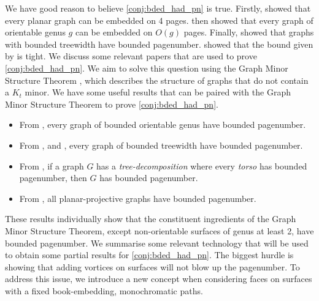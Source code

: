 We have good reason to believe \cref{conj:bded_had_pn} is true. Firstly, \textcite{yannakakisEmbeddingPlanarGraphs1989} showed that every planar graph can be embedded on 4 pages. \textcite{heathPagenumberGenusGraphs1992} then showed that every graph of orientable genus $g$ can be embedded on $O(g)$ pages. Finally, \textcite{ganleyPagenumberTrees2001} showed that graphs with bounded treewidth have bounded pagenumber. \textcite{dujmovicGraphTreewidthGeometric2007} showed that the bound given by \citeauthor{ganleyPagenumberTrees2001} is tight.
We discuss some relevant papers that are used to prove \cref{conj:bded_had_pn}.
We aim to solve this question using the Graph Minor Structure Theorem \cite{robertsonGraphMinorsXVI2003}, which describes the structure of graphs that do not contain a \(K_t\) minor. 
We have some useful results that can be paired with the Graph Minor Structure Theorem to prove \cref{conj:bded_had_pn}.
\begin{itemize}
	\item From \textcite{heathPagenumberGenusGraphs1992}, every graph of bounded orientable genus have bounded pagenumber.
	\item From \textcite{ganleyPagenumberTrees2001}, and \textcite{dujmovicGraphTreewidthGeometric2007}, every graph of bounded treewidth have bounded pagenumber.
	\item From \textcite{hickingbothamStackNumberCliqueSum2023}, if a graph \(G\) has a \textit{tree-decomposition} where every \textit{torso} has bounded pagenumber, then \(G\) has bounded pagenumber.
	\item From \textcite{nakamotoBookEmbeddingProjectiveplanar2015}, all planar-projective graphs have bounded pagenumber.
\end{itemize}
These results individually show that the constituent ingredients of the Graph Minor Structure Theorem, except non-orientable surfaces of genus at least 2, have bounded pagenumber. We summarise some relevant technology that will be used to obtain some partial results for \cref{conj:bded_had_pn}. 
The biggest hurdle is showing that adding vortices on surfaces will not blow up the pagenumber. To address this issue, we introduce a new concept when considering faces on surfaces with a fixed book-embedding, monochromatic paths. 
